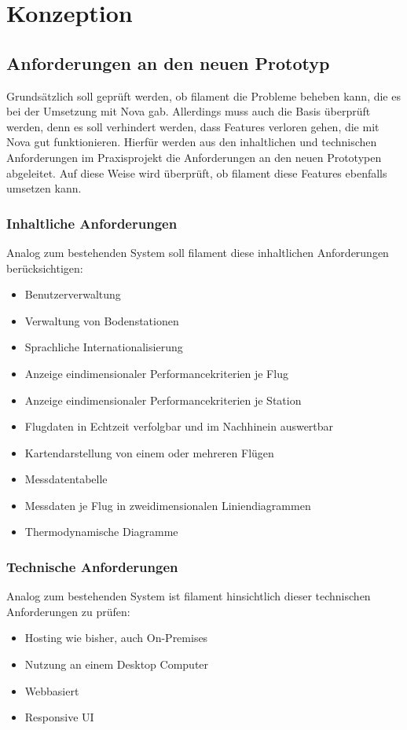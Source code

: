 \section{Konzeption}

\subsection{Anforderungen an den neuen Prototyp}

Grundsätzlich soll geprüft werden, ob filament die Probleme beheben kann, die es bei der Umsetzung mit Nova gab.
Allerdings muss auch die Basis überprüft werden, denn es soll verhindert werden, dass Features verloren gehen, die mit Nova gut funktionieren.
Hierfür werden aus den inhaltlichen und technischen Anforderungen im Praxisprojekt die Anforderungen an den neuen Prototypen abgeleitet.
Auf diese Weise wird überprüft, ob filament diese Features ebenfalls umsetzen kann.

\subsubsection{Inhaltliche Anforderungen}
Analog zum bestehenden System soll filament diese inhaltlichen Anforderungen berücksichtigen:
\begin{itemize}
    \item Benutzerverwaltung
    \item Verwaltung von Bodenstationen
    \item Sprachliche Internationalisierung
    \item Anzeige eindimensionaler Performancekriterien je Flug
    \item Anzeige eindimensionaler Performancekriterien je Station
    \item Flugdaten in Echtzeit verfolgbar und im Nachhinein auswertbar
    \item Kartendarstellung von einem oder mehreren Flügen
    \item Messdatentabelle
    \item Messdaten je Flug in zweidimensionalen Liniendiagrammen
    \item Thermodynamische Diagramme
\end{itemize}

\subsubsection{Technische Anforderungen}
Analog zum bestehenden System ist filament hinsichtlich dieser technischen Anforderungen zu prüfen:
\begin{itemize}
    \item Hosting wie bisher, auch On-Premises
    \item Nutzung an einem Desktop Computer
    \item Webbasiert
    \item Responsive UI
\end{itemize}

